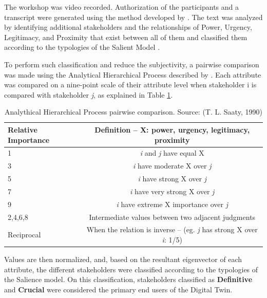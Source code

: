 \documentclass[authoryear,preprint,review,12pt]{elsarticle}
\begin{document}
    The workshop was video recorded. Authorization of the participants and a transcript were generated using the method developed by \citet{Radford2022}. The text was analyzed by identifying additional stakeholders and the relationships of Power, Urgency, Legitimacy, and Proximity that exist between all of them and classified them according to the typologies of the Salient Model \citep{Mitchell1997, Shafique2022}.

    To perform such classification and reduce the subjectivity, a pairwise comparison was made using the Analytical Hierarchical Process described by \citet{Saaty1987, Saaty1990}. Each attribute was compared on a nine-point scale of their attribute level when stakeholder i is compared with stakeholder \textit{j}, as explained in Table \ref{tab:Saaty}.

    \begin{table}
        \centering
        \caption{Analythical Hierarchical Process pairwise comparison. Source: (T. L. Saaty, 1990)}
        \small
        \label{tab:Saaty}
        \begin{tabularx}{\linewidth}{X c}
            \toprule
            Relative Importance&Definition – X: power, urgency, legitimacy, proximity\\
            \midrule
            1&\textit{i} and \textit{j} have equal X\\
            3&\textit{i} have moderate X over \textit{j}\\
            5&\textit{i} have strong X over \textit{j}\\
            7&\textit{i} have very strong X over \textit{j}\\
            9&\textit{i} have extreme X importance over \textit{j}\\
            2,4,6,8&Intermediate values between two adjacent judgments\\
            Reciprocal&When the relation is inverse –
            (eg. \textit{j} has strong X over \textit{i}: 1/5)\\
            \bottomrule        
        \end{tabularx}
    \end{table}
    Values are then normalized, and, based on the resultant eigenvector of each attribute, the different stakeholders were classified according to the typologies of the Salience model. On this classification, stakeholders classified as \textbf{Definitive} and \textbf{Crucial} were considered the primary end users of the Digital Twin.
\end{document}
